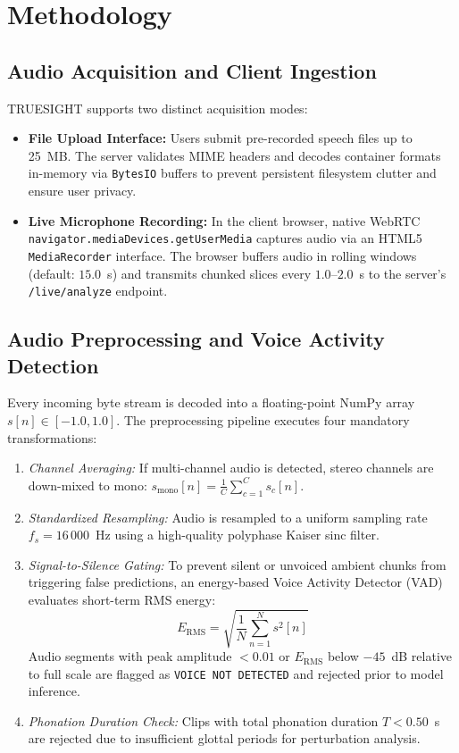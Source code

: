 \documentclass[conference]{IEEEtran}
\begin{document}
\section{Methodology}

\subsection{Audio Acquisition and Client Ingestion}
TRUESIGHT supports two distinct acquisition modes:
\begin{itemize}
    \item \textbf{File Upload Interface:} Users submit pre-recorded speech files up to 25~MB. The server validates MIME headers and decodes container formats in-memory via \texttt{BytesIO} buffers to prevent persistent filesystem clutter and ensure user privacy.
    \item \textbf{Live Microphone Recording:} In the client browser, native WebRTC \texttt{navigator.mediaDevices.getUserMedia} captures audio via an HTML5 \texttt{MediaRecorder} interface. The browser buffers audio in rolling windows (default: $15.0$~s) and transmits chunked slices every $1.0$--$2.0$~s to the server's \texttt{/live/analyze} endpoint.
\end{itemize}

\subsection{Audio Preprocessing and Voice Activity Detection}
Every incoming byte stream is decoded into a floating-point NumPy array $s[n] \in [-1.0, 1.0]$. The preprocessing pipeline executes four mandatory transformations:
\begin{enumerate}
    \item \textit{Channel Averaging:} If multi-channel audio is detected, stereo channels are down-mixed to mono: $s_{\text{mono}}[n] = \frac{1}{C}\sum_{c=1}^C s_c[n]$.
    \item \textit{Standardized Resampling:} Audio is resampled to a uniform sampling rate $f_s = 16\,000$~Hz using a high-quality polyphase Kaiser sinc filter.
    \item \textit{Signal-to-Silence Gating:} To prevent silent or unvoiced ambient chunks from triggering false predictions, an energy-based Voice Activity Detector (VAD) evaluates short-term RMS energy:
    \begin{equation}
        E_{\text{RMS}} = \sqrt{\frac{1}{N}\sum_{n=1}^N s^2[n]}
    \end{equation}
    Audio segments with peak amplitude $< 0.01$ or $E_{\text{RMS}}$ below $-45$~dB relative to full scale are flagged as \texttt{VOICE NOT DETECTED} and rejected prior to model inference.
    \item \textit{Phonation Duration Check:} Clips with total phonation duration $T < 0.50$~s are rejected due to insufficient glottal periods for perturbation analysis.
\end{enumerate}
\end{document}
